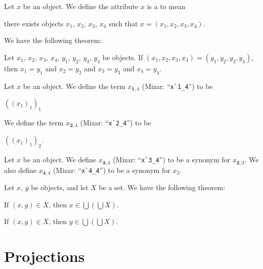 \documentclass{article}
\begin{document}
\begin{definition}
Let $x$ be an object. We define the attribute $x$ is a
 to mean
\begin{defn}
\item there exists objects $x_{1}$, $x_{2}$, $x_{3}$, $x_{4}$ such that $x=(x_{1},x_{2},x_{3},x_{4})$.
\end{defn}
\end{definition}



We have the following theorem:
\begin{thm}
\item\label{xtuple0:5} Let $x_{1}$, $x_{2}$, $x_{3}$, $x_{4}$, $y_{1}$, $y_{2}$, $y_{3}$, $y_{4}$
be objects. If $(x_{1},x_{2},x_{3},x_{4})=(y_{1},y_{2},y_{3},y_{4})$,
then $x_{1}=y_{1}$ and $x_{2}=y_{2}$ and $x_{3}=y_{3}$ and $x_{4}=y_{4}$.
\end{thm}

\begin{definition}
Let $x$ be an object. We define the term $x_{\mathbf{1},4}$ (Mizar: ``\verb#x`1_4#'') to be
\begin{defn}\label{xtuple0:def10}
\item $((x_{1})_{1})_{1}$
\end{defn}
We define the term $x_{\mathbf{2},4}$ (Mizar: ``\verb#x`2_4#'') to be
\begin{defn}
\item $((x_{1})_{1})_{2}$.
\end{defn}
\end{definition}

\begin{notation}
Let $x$ be an object. We define $x_{\mathbf{3},4}$ (Mizar: ``\verb#x`3_4#'') to be a synonym for $x_{\mathbf{2},3}$.
We also define $x_{\mathbf{4},4}$ (Mizar: ``\verb#x`4_4#'') to be a
synonym for $x_{2}$.
\end{notation}

Let $x$, $y$ be objects, and let $X$ be a set. We have the following theorem:
\begin{thm}
\item\label{xtuple0:6} If $(x,y)\in X$, then $x\in\bigcup(\bigcup X)$.
\item\label{xtuple0:7} If $(x,y)\in X$, then $y\in\bigcup(\bigcup X)$.
\end{thm}

\section{Projections}
\end{document}
